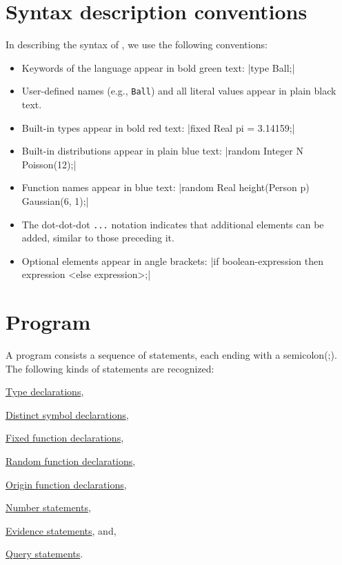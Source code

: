 \documentclass[12pt]{article}
\begin{document}
\section{Syntax description conventions}\label{convention-section}
In describing the syntax of \bl, we use the following conventions:
\begin{itemize}
\item Keywords of the language appear in bold green text: \blog|type Ball;|
\item User-defined names (e.g., {\tt Ball}) and all literal values appear in plain black text.
\item Built-in types appear in bold red text: \blog|fixed Real pi = 3.14159;|
\item Built-in distributions appear in plain blue text: \blog|random Integer N ~ Poisson(12);|
\item Function names appear in blue text: \blog|random Real height(Person p) ~ Gaussian(6, 1);|
\item The dot-dot-dot \verb|...| notation indicates that additional elements can be added, similar to those preceding it.
\item Optional elements appear in angle brackets: \blog|if boolean-expression then expression <else expression>;|
\end{itemize}

\section{\bl Program}\label{program-section}
A \bl program consists a sequence of statements, each ending with a semicolon(;). 
The following kinds of statements are recognized:
\begin{enumerate*}
\item \hyperref[type-declaration-section]{Type declarations}, 
\item \hyperref[distinct-section]{Distinct symbol declarations}, 
\item \hyperref[fixed-section]{Fixed function declarations},
\item \hyperref[random-function-section]{Random function declarations},
\item \hyperref[origin-section]{Origin function declarations},
\item \hyperref[number-section]{Number statements},
\item \hyperref[evidence-section]{Evidence statements}, and,
\item \hyperref[query-section]{Query statements}.
\end{enumerate*}
\end{document}

